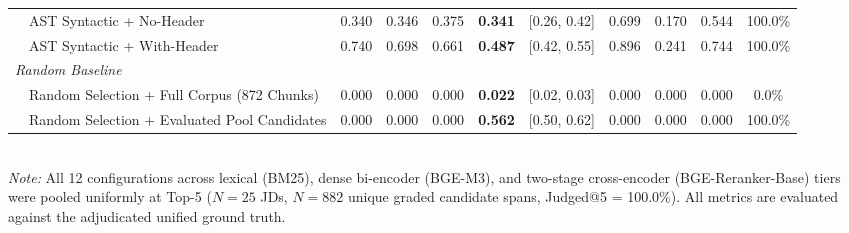 \begin{table}[t]
\begin{tabular}{llccccccccc}
  & AST Syntactic + No-Header      & 0.340 & 0.346 & 0.375 & \textbf{0.341} & [0.26, 0.42] & 0.699 & 0.170 & 0.544 & 100.0\% \\
  & AST Syntactic + With-Header    & 0.740 & 0.698 & 0.661 & \textbf{0.487} & [0.42, 0.55] & 0.896 & 0.241 & 0.744 & 100.0\% \\
\midrule
\multicolumn{11}{l}{\textit{Random Baseline}} \\
  & Random Selection + Full Corpus (872 Chunks) & 0.000 & 0.000 & 0.000 & \textbf{0.022} & [0.02, 0.03] & 0.000 & 0.000 & 0.000 & 0.0\% \\
  & Random Selection + Evaluated Pool Candidates & 0.000 & 0.000 & 0.000 & \textbf{0.562} & [0.50, 0.62] & 0.000 & 0.000 & 0.000 & 100.0\% \\
\bottomrule
\end{tabular}
\vspace{1mm}\\
\footnotesize{\textit{Note:} All 12 configurations across lexical (BM25), dense bi-encoder (BGE-M3), and two-stage cross-encoder (BGE-Reranker-Base) tiers were pooled uniformly at Top-5 ($N=25$ JDs, $N=882$ unique graded candidate spans, Judged@5 = 100.0\%). All metrics are evaluated against the adjudicated unified ground truth.}
\vspace{-2mm}
\end{table}